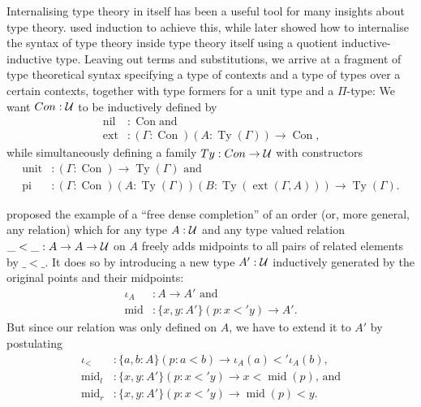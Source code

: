 \begin{example}\label{ex:ttintt}
Internalising type theory in itself has been a useful tool for many insights
about type theory.
\cite{danielsson2006formalisation} used induction to achieve this, while later
\cite{ttintt} showed how to internalise the syntax of type theory inside type
theory itself using a quotient inductive-inductive type.
Leaving out terms and substitutions, we arrive at a fragment of type theoretical
syntax specifying a type of contexts and a type of types over a certain contexts,
together with type formers for a unit type and a $\Pi$-type:
We want $\mathop{Con} : \mathcal{U}$ to be inductively defined by
\begin{align*}
\mathop{nil}	&: \mathop{Con} \text{and } \\
\mathop{ext}	&: (\Gamma : \mathop{Con})(A : \mathop{Ty}(\Gamma)) \to \mathop{Con} \text{,}
\end{align*}
while simultaneously defining a family $\mathop{Ty} : \mathop{Con} \to \mathcal{U}$ with constructors
\begin{align*}
\mathop{unit}	&: (\Gamma : \mathop{Con}) \to \mathop{Ty}(\Gamma) \text{ and} \\
\mathop{pi}	&: (\Gamma : \mathop{Con})(A : \mathop{Ty}(\Gamma))(B : \mathop{Ty}(\mathop{ext}(\Gamma, A))) \to \mathop{Ty}(\Gamma) \text{.}
\end{align*}
\end{example}

\begin{example}
\citet{nordvallinductive} proposed the example of a ``free dense completion'' of
an order (or, more general, any relation) which for any type $A : \mathcal{U}$ and
any type valued relation $\_<\_ : A \to A \to \mathcal{U}$ on $A$ freely adds midpoints
to all pairs of related elements by $\_<\_$.
It does so by introducing a new type $A' : \mathcal{U}$ inductively generated by the
original points and their midpoints:
\begin{align*}
\iota_A		&: A \to A' \text{ and} \\
\mathop{mid}	&: \{x, y : A'\}(p : x <' y) \to A' \text{.}
\end{align*}
But since our relation was only defined on $A$, we have to extend it to $A'$ by
postulating
\begin{align*}
\iota_<		&: \{a, b : A\}(p : a < b) \to \iota_A(a) <' \iota_A(b) \text{,} \\
\mathop{mid}_l	&: \{x, y : A'\}(p : x <' y) \to x < \mathop{mid}(p) \text{, and} \\
\mathop{mid}_r	&: \{x, y : A'\}(p : x <' y) \to \mathop{mid}(p) < y \text{.}
\end{align*}
\end{example}


